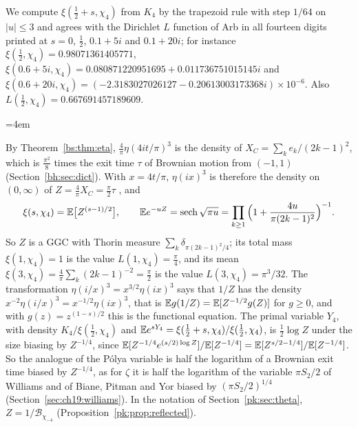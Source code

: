 We compute $\xi(\frac12+s,\chi_4)$ from $K_4$ by the trapezoid rule with step $1/64$ on $|u|\le3$ and agrees with the Dirichlet $L$ function of Arb \cite{Arb} in all fourteen digits printed at $s=0$, $\frac12$, $0.1+5i$ and $0.1+20i$; for instance $\xi(\frac12,\chi_4)=0.98071361405771$, $\xi(0.6+5i,\chi_4)=0.080871220951695+0.011736751015145i$ and $\xi(0.6+20i,\chi_4)=(-2.3183027026127-0.20613003173368i)\times10^{-6}$. Also $L(\frac12,\chi_4)=0.667691457189609$.
{\emergencystretch=4em \par}
\begin{remark}\label{rem:dbeta:exit}
By Theorem~\ref{bs:thm:eta}, $\frac4\pi\eta(4it/\pi)^3$ is the density of $X_C=\sum_ke_k/(2k-1)^2$, which is $\frac{\pi^2}8$ times the exit time $\tau$ of Brownian motion from $(-1,1)$ (Section~\ref{bh:sec:dict}). With $x=4t/\pi$, $\eta(ix)^3$ is therefore the density on $(0,\infty)$ of $Z=\frac4\pi X_C=\frac\pi2\tau$ \cite[Section 3]{P26thor}, and
\[
\xi(s,\chi_4)=\mathbb{E}\big[Z^{(s-1)/2}\big],\qquad \mathbb{E} e^{-uZ}=\operatorname{sech}\sqrt{\pi u}=\prod_{k\ge1}\Big(1+\frac{4u}{\pi(2k-1)^2}\Big)^{-1}.
\]
So $Z$ is a GGC with Thorin measure $\sum_k\delta_{\pi(2k-1)^2/4}$; its total mass $\xi(1,\chi_4)=1$ is the value $L(1,\chi_4)=\frac\pi4$, and its mean $\xi(3,\chi_4)=\frac4\pi\sum_k(2k-1)^{-2}=\frac\pi2$ is the value $L(3,\chi_4)=\pi^3/32$. The transformation $\eta(i/x)^3=x^{3/2}\eta(ix)^3$ says that $1/Z$ has the density $x^{-2}\eta(i/x)^3=x^{-1/2}\eta(ix)^3$, that is $\mathbb{E} g(1/Z)=\mathbb{E}[Z^{-1/2}g(Z)]$ for $g\ge0$, and with $g(z)=z^{(1-s)/2}$ this is the functional equation. The primal variable $Y_4$, with density $K_4/\xi(\frac12,\chi_4)$ and $\mathbb{E} e^{sY_4}=\xi(\frac12+s,\chi_4)/\xi(\frac12,\chi_4)$, is $\frac12\log Z$ under the size biasing by $Z^{-1/4}$, since $\mathbb{E}[Z^{-1/4}e^{(s/2)\log Z}]/\mathbb{E}[Z^{-1/4}]=\mathbb{E}[Z^{s/2-1/4}]/\mathbb{E}[Z^{-1/4}]$. So the analogue of the P\'olya variable is half the logarithm of a Brownian exit time biased by $Z^{-1/4}$, as for $\zeta$ it is half the logarithm of the variable $\pi S_2/2$ of Williams and of Biane, Pitman and Yor biased by $(\pi S_2/2)^{1/4}$ (Section~\ref{sec:ch19:williams}). In the notation of Section~\ref{pk:sec:theta}, $Z=1/\mathcal B_{\chi_{-4}}$ (Proposition~\ref{pk:prop:reflected}).
\end{remark}

